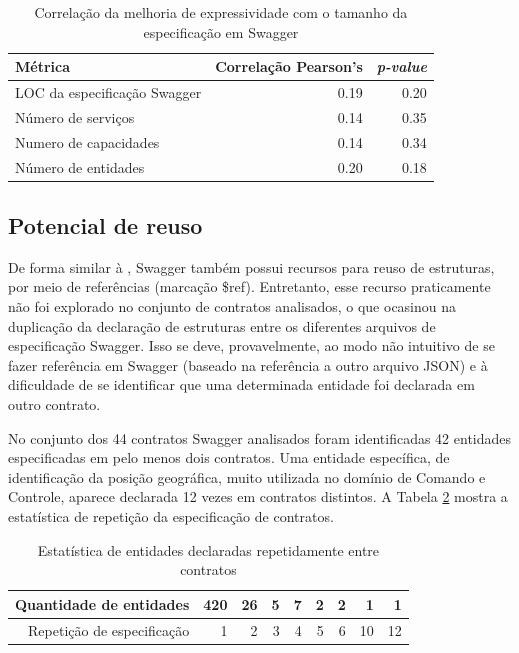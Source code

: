 % 
% 

\begin{table}[htb]
\caption{Correlação da melhoria de expressividade com o tamanho da especificação
em Swagger}
\begin{center}
\begin{tabular}{lrr} 
\toprule
Métrica & Correlação Pearson's & \emph{p-value} \\ \hline \hline 
LOC da especificação Swagger & 0.19 &  0.20 \\ 
Número de serviços & 0.14 & 0.35 \\ 
Numero de capacidades & 0.14 & 0.34 \\
Número de entidades & 0.20 & 0.18 \\ \bottomrule 
\end{tabular} 
\end{center}
\label{tab:size-corr}
\end{table}



\subsection{Potencial de reuso}

De forma similar à \neoidl{}, Swagger também possui recursos para reuso de
estruturas, por meio de referências (marcação \$ref). Entretanto, esse recurso
praticamente não foi explorado no conjunto de contratos analisados, o que
ocasinou na duplicação da declaração de estruturas entre os diferentes arquivos
de especificação Swagger. Isso se deve, provavelmente, ao modo não intuitivo de
se fazer referência em Swagger (baseado na referência a outro arquivo JSON) e à
dificuldade de se identificar que uma determinada entidade foi declarada em
outro contrato.

No conjunto dos 44 contratos Swagger analisados foram identificadas 42 entidades
especificadas em pelo menos dois contratos. Uma entidade específica, de
identificação da posição geográfica, muito utilizada no domínio de Comando e Controle, aparece
declarada 12 vezes em contratos distintos. A Tabela \ref{estatisticaEntidades}
mostra a estatística de repetição da especificação de contratos.
 
\begin{table}[!bth] 
\centering
\vspace{0.5cm}
\footnotesize
\begin{tabular}{|r|r|r|r|r|r|r|r|r|}
\hline   
Quantidade de entidades & 420 & 26 & 5 & 7 & 2 & 2 & 1 & 1 \\
\hline
Repetição de especificação & 1 & 2 & 3 & 4 & 5 & 6 & 10 & 12 \\
\hline

\end{tabular}
\caption{Estatística de entidades declaradas repetidamente entre contratos}
\label{estatisticaEntidades}
\end{table}

